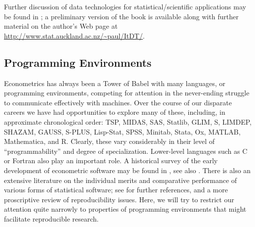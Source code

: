 \documentclass[10pt,a4paper,twoside]{article}
\let\proglang=\textsf
\begin{document}
Further discussion of data technologies for statistical/scientific applications may
be found in \cite{repro:Murrell:2009}; a preliminary version of the book is
available along with further material on the author's Web page at
\url{http://www.stat.auckland.ac.nz/~paul/ItDT/}.


\subsection{Programming Environments} \label{sec:programming}


Econometrics has always been a Tower of Babel with many languages, or programming
environments,  
competing for attention in the never-ending struggle to communicate effectively
with machines. Over the course of our disparate careers we have had
opportunities to explore many of these, including, in approximate chronological order:  
\proglang{TSP}, \proglang{MIDAS}, \proglang{SAS}, \proglang{Statlib},
\proglang{GLIM}, \proglang{S}, \proglang{LIMDEP}, \proglang{SHAZAM}, \proglang{GAUSS},
\proglang{S-PLUS}, \proglang{Lisp-Stat}, \proglang{SPSS}, \proglang{Minitab},
\proglang{Stata}, \proglang{Ox}, \proglang{MATLAB}, \proglang{Mathematica}, and 
\proglang{R}. Clearly, these vary considerably in their level of ``programmability'' and
degree of specialization. Lower-level languages such as \proglang{C} or \proglang{Fortran}
also play an important role. A historical survey of the early development of econometric software
may be found in \cite{repro:Renfro:2004}, see also \cite{repro:Ooms+Doornik:2006}. 
There is also an extensive literature on the individual merits and comparative 
performance of various forms of statistical software;  see \cite{repro:Baiocchi:2007} 
for further references, and a more proscriptive review of reproducibility issues.
Here, we will try to restrict our attention quite narrowly to properties of
programming environments that might facilitate reproducible research.
\end{document}
